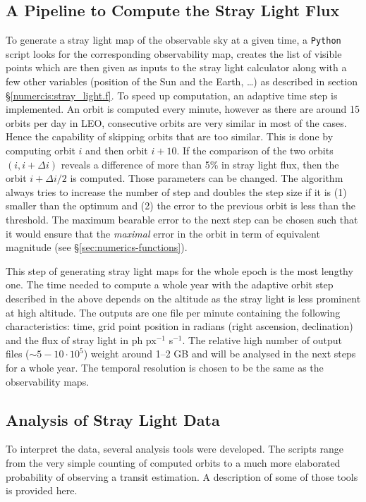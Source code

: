 \documentclass[a4paper,10pt]{article}
\begin{document}
\subsection{A Pipeline to Compute the Stray Light Flux} \label{sec:numerics-pipeline}
To generate a stray light map of the observable sky at a given time, a \verb=Python= script looks for the corresponding observability map, creates the list of visible points which are then given as inputs to the stray light calculator along with a few other variables (position of the Sun and the Earth, \dots) as described in section \S\ref{numercis:stray_light.f}. To speed up computation, an adaptive time step is implemented. An orbit is computed every minute, however as there are around 15 orbits per day in LEO, consecutive orbits are very similar in most of the cases. Hence the capability of skipping orbits that are too similar. This is done by computing orbit $i$ and then orbit $i+10$. If the comparison of the two orbits $(i, i+\Delta i)$ reveals a difference of more than 5\% in stray light flux, then the orbit $i+\Delta i/2$ is computed. Those parameters can be changed. 
The algorithm always tries to increase the number of step and doubles the step size if it is (1) smaller than the optimum and (2) the error to the previous orbit is less than the threshold. The maximum bearable error to the next step can be chosen such that it would ensure that the \emph{maximal} error in the orbit in term of equivalent magnitude (see \S\ref{sec:numerics-functions}). 

This step of generating stray light maps for the whole epoch is the most lengthy one. The time needed to compute a whole year with the adaptive orbit step described in the above depends on the altitude as the stray light is less prominent at high altitude. The outputs are one file per minute containing the following characteristics: time, grid point position in radians (right ascension, declination) and the flux of stray light in ph px$^{-1}$ s$^{-1}$. The relative high number of output files ($\sim 5-10\cdot 10^5$) weight around 1--2 GB and will be analysed in the next steps for a whole year.
The temporal resolution is chosen to be the same as the observability maps.

\subsection{Analysis of Stray Light Data} \label{sec:numerics-analysis}
To interpret the data, several analysis tools were developed. The scripts range from the very simple counting of computed orbits to a much more elaborated probability of observing a transit estimation. A description of some of those tools is provided here. 
\end{document}
